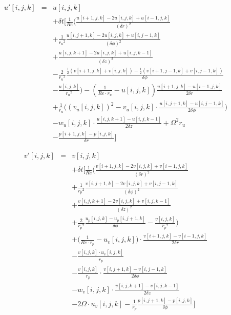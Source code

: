 \documentclass[12pt, a4paper]{article} %
\begin{document}
			{\allowdisplaybreaks
			\begin{eqnarray}
				u'[i,j,k] &=& u[i,j,k]	\nonumber \\
				&& +\delta t \Bigg[\frac{1}{Re}\bigg(\frac{u[i+1,j,k]-2u[i,j,k]+u[i-1,j,k]}{(\delta r)^2}	\nonumber \\
				&& + \frac{1}{{r_u}^2}\frac{u[i,j+1,k]-2u[i,j,k]+u[i,j-1,k]}{(\delta \phi)^2}	\nonumber \\
				&& + \frac{u[i,j,k+1] - 2u[i,j,k] +u[i,j,k-1]}{(\delta z)^2}	\nonumber \\
				&& - \frac{2}{{r_u}^2}\frac{\frac{1}{2}\left(v[i+1,j,k]+v[i,j,k]\right)-\frac{1}{2}\left(v[i+1,j-1,k]+v[i,j-1,k]\right)}{\delta \phi}	\nonumber \\
				&& - \frac{u[i,j,k]}{{r_u}^2}\bigg) - \left(\frac{1}{Re\cdot r_u} - u[i,j,k]\right)\frac{u[i+1,j,k]-u[i-1,j,k]}{2\delta r}	\nonumber \\
				&& + \frac{1}{r_u}\bigg(\left(v_u[i,j,k]\right)^2 - v_u[i,j,k] \cdot \frac{u[i,j+1,k]-u[i,j-1,k]}{2\delta \phi}\bigg)	\nonumber \\
				&& - w_u[i,j,k] \cdot \frac{u[i,j,k+1]-u[i,j,k-1]}{2\delta z} + \Omega^2 r_u	\nonumber \\
				&& - \frac{p[i+1,j,k]-p[i,j,k]}{\delta r} \Bigg]
				\label{eq:Discrete u}
			\end{eqnarray}
			
			\begin{eqnarray}
				v'[i,j,k] &=& v[i,j,k]	\nonumber \\
				&& + \delta t \Bigg[ \frac{1}{Re} \bigg( \frac{v[i+1,j,k]-2 v[i,j,k]+v[i-1,j,k]}{(\delta r)^2}	\nonumber \\
				&& + \frac{1}{{r_p}^2} \frac{v[i,j+1,k]-2v[i,j,k]+v[i,j-1,k]}{(\delta \phi)^2}	\nonumber \\
				&& + \frac{v[i,j,k+1]-2v[i,j,k]+v[i,j,k-1]}{(\delta z)^2}	\nonumber \\
				&& + \frac{2}{{r_p}^2} \frac{u_p[i,j,k]-u_p[i,j+1,k]}{\delta\phi} - \frac{v[i,j,k]}{{r_p}^2} \bigg) \nonumber \\
				&& + \bigg( \frac{1}{Re\cdot r_p} - u_v[i,j,k] \bigg) \cdot \frac{v[i+1,j,k]-v[i-1,j,k]}{2\delta r} \nonumber \\
				&& - \frac{v[i,j,k] \cdot u_v[i,j,k]}{r_p} \nonumber \\
				&& - \frac{v[i,j,k]}{r_p}\cdot \frac{v[i,j+1,k]-v[i,j-1,k]}{2\delta \phi} \nonumber \\
				&& - w_v[i,j,k] \cdot \frac{v[i,j,k+1]-v[i,j,k-1]}{2\delta z} \nonumber \\
				&& - 2\Omega\cdot u_v[i,j,k] - \frac{1}{r_p} \frac{p[i,j+1,k]-p[i,j,k]}{\delta \phi}
				\Bigg]
				\label{eq:Discrete v}
			\end{eqnarray}
						
}
\end{document}
